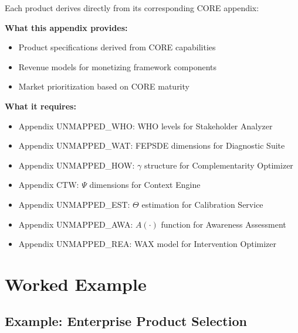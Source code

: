 Each product derives directly from its corresponding CORE appendix:

\begin{tcolorbox}[colback=yellow!5!white, colframe=yellow!75!black,
    title=Integration: VVV.3 $\leftrightarrow$ 10C CORE Appendices]
\textbf{What this appendix provides:}
\begin{itemize}[nosep]
\item Product specifications derived from CORE capabilities
\item Revenue models for monetizing framework components
\item Market prioritization based on CORE maturity
\end{itemize}

\textbf{What it requires:}
\begin{itemize}[nosep]
\item Appendix UNMAPPED_WHO: WHO levels for Stakeholder Analyzer
\item Appendix UNMAPPED_WAT: FEPSDE dimensions for Diagnostic Suite
\item Appendix UNMAPPED_HOW: $\gamma$ structure for Complementarity Optimizer
\item Appendix CTW: $\Psi$ dimensions for Context Engine
\item Appendix UNMAPPED_EST: $\Theta$ estimation for Calibration Service
\item Appendix UNMAPPED_AWA: $A(\cdot)$ function for Awareness Assessment
\item Appendix UNMAPPED_REA: WAX model for Intervention Optimizer
\end{itemize}
\end{tcolorbox}



\section{Worked Example}
\label{sec:vvv3-example}

\subsection{Example: Enterprise Product Selection}

